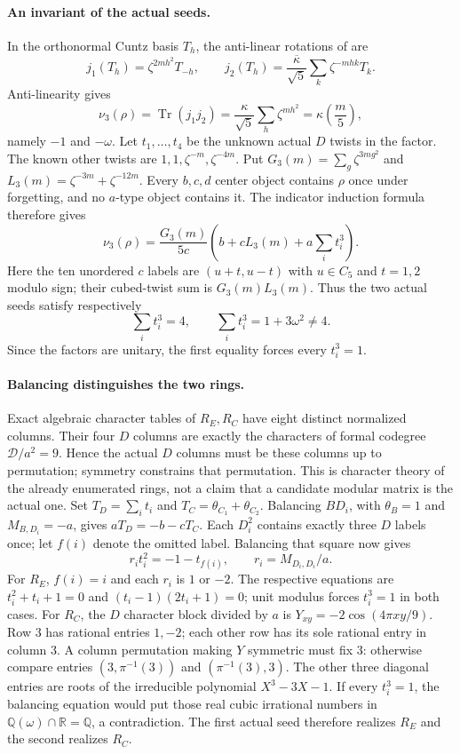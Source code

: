 \paragraph{An invariant of the actual seeds.}
In the orthonormal Cuntz basis $T_h$, the anti-linear rotations of
\cite[Remark~3.11 and Section~9]{IzumiNear} are
\[
 j_1(T_h)=\zeta^{2mh^2}T_{-h},\qquad
 j_2(T_h)=\frac{\overline\kappa}{\sqrt5}
                    \sum_k\zeta^{-mhk}T_k.
\]
Anti-linearity gives
\[
 \nu_3(\rho)=\operatorname{Tr}(j_1j_2)
  =\frac{\kappa}{\sqrt5}\sum_h\zeta^{mh^2}
  =\kappa\left(\frac m5\right),
\]
namely $-1$ and $-\omega$. Let $t_1,\ldots,t_4$ be the unknown actual
$D$ twists in the factor. The known other twists are
$1,1,\zeta^{-m},\zeta^{-4m}$. Put
$G_3(m)=\sum_g\zeta^{3mg^2}$ and
$L_3(m)=\zeta^{-3m}+\zeta^{-12m}$.
Every $b,c,d$ center object contains $\rho$ once under forgetting, and
no $a$-type object contains it. The indicator induction formula
\cite[Theorem~4.1]{NgIndicators} therefore gives
\[
 \nu_3(\rho)=\frac{G_3(m)}{5c}
           \left(b+cL_3(m)+a\sum_i t_i^3\right).
\]
Here the ten unordered $c$ labels are $(u+t,u-t)$ with
$u\in C_5$ and $t=1,2$ modulo sign; their cubed-twist sum is
$G_3(m)L_3(m)$. Thus the two actual seeds satisfy respectively
\[
 \sum_i t_i^3=4,\qquad \sum_i t_i^3=1+3\omega^2\ne4.
\]
Since the factors are unitary, the first equality forces every
$t_i^3=1$.

\paragraph{Balancing distinguishes the two rings.}
Exact algebraic character tables of $R_E,R_C$ have eight distinct
normalized columns. Their four $D$ columns are exactly the characters
of formal codegree $\mathcal D/a^2=9$. Hence the actual $D$ columns
must be these columns up to permutation; symmetry constrains that
permutation. This is character theory of the already enumerated rings,
not a claim that a candidate modular matrix is the actual one.
Set $T_D=\sum_it_i$ and $T_C=\theta_{C_1}+\theta_{C_2}$.
Balancing $BD_i$, with $\theta_B=1$ and $M_{B,D_i}=-a$, gives
$aT_D=-b-cT_C$. Each $D_i^2$ contains exactly three $D$ labels once;
let $f(i)$ denote the omitted label. Balancing that square now gives
\[
 r_i t_i^2=-1-t_{f(i)},\qquad r_i=M_{D_i,D_i}/a.
\]
For $R_E$, $f(i)=i$ and each $r_i$ is $1$ or $-2$. The respective
equations are $t_i^2+t_i+1=0$ and
$(t_i-1)(2t_i+1)=0$; unit modulus forces $t_i^3=1$ in both cases.
For $R_C$, the $D$ character block divided by $a$ is
$Y_{xy}=-2\cos(4\pi xy/9)$. Row $3$ has rational entries $1,-2$;
each other row has its sole rational entry in column $3$.
A column permutation making $Y$ symmetric must fix $3$: otherwise
compare entries $(3,\pi^{-1}(3))$ and $(\pi^{-1}(3),3)$.
The other three diagonal entries are roots of the irreducible
polynomial $X^3-3X-1$. If every $t_i^3=1$, the balancing equation
would put those real cubic irrational numbers in
$\mathbb Q(\omega)\cap\mathbb R=\mathbb Q$, a contradiction.
The first actual seed therefore realizes $R_E$ and the second realizes
$R_C$.

